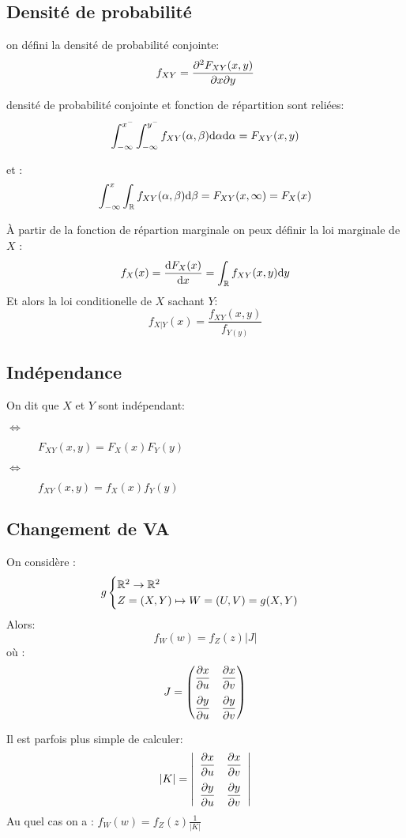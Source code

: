 \documentclass[main.tex]{subfiles}
\begin{document}
\subsection{Densité de probabilité}
\begin{defin}
  on défini la densité de probabilité conjointe:
  \[
    f_{XY} = \derivp[^2F_{XY}(x,y)]{x\partial y }
  \]
\end{defin}

\begin{prop}
  densité de probabilité conjointe et fonction de répartition sont reliées:
  \[
    \int_{-\infty}^{x^-}\int_{-\infty}^{y^-} f_{XY}(\alpha,\beta)\d \alpha \d \alpha = F_{XY}(x,y)
  \]

  et :
  \[
    \int_{-\infty}^{x}\int_{\R}^{}f_{XY}(\alpha,\beta)\d \beta = F_{XY}(x,\infty) =F_X(x)
  \]
\end{prop}
\begin{defin}
  À partir de la fonction de répartion  marginale on peux définir la loi marginale de $X$ :
  \[
    f_X(x) = \deriv[F_X(x)]{x} =\int_{\R}^{}f_{XY}(x,y)\d y
  \]
  Et alors la loi  conditionelle de $X$ sachant $Y$:
  \[
    f_{X|Y}(x) = \frac{f_{XY}(x,y)}{f_{Y(y)}}
  \]
\end{defin}

\subsection{Indépendance}
\begin{defin}
  On dit que $X$ et $Y$ sont indépendant:
  \begin{description}
  \item[$\iff$] $F_{XY}(x,y)=F_X(x)F_Y(y)$
  \item[$\iff$] $f_{XY}(x,y)=f_X(x)f_Y(y)$
  \end{description}
\end{defin}
\subsection{Changement de VA}
\begin{prop}
  On considère :
  \[
    g
    \begin{cases}
      \R^2 \to \R^2\\
      Z =(X,Y) \mapsto W =(U,V)=g(X,Y)
    \end{cases}
  \]
  Alors:
\[
  f_W(w) = f_Z(z)|J|
\]
où :
\[
J =
\begin{pmatrix}
  \displaystyle\derivp[x]{u} & \displaystyle\derivp[x]{v}\\[1em]
  \displaystyle\derivp[y]{u} & \displaystyle\derivp[y]{v}
\end{pmatrix}
\]
\end{prop}
\begin{rem}
  Il est parfois plus simple de calculer:
  \[
|K| =\left|
\begin{array}{cc}
  \displaystyle\derivp[x]{u} & \displaystyle\derivp[x]{v}\\[1em]
  \displaystyle\derivp[y]{u} & \displaystyle\derivp[y]{v}
\end{array}\right|
\]
Au quel cas on a : $f_W(w) = f_Z(z)\frac{1}{|K|}$
\end{rem}
\end{document}
